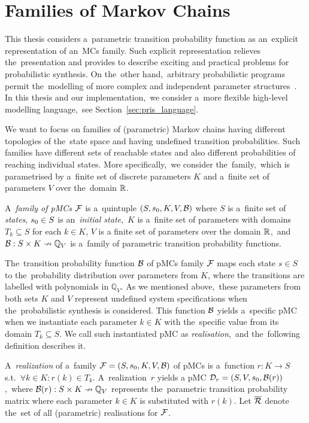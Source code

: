 \section{Families of Markov Chains}
This thesis considers a~parametric transition probability function as an~explicit representation of an~MCs family.
Such explicit representation relieves the~presentation and provides to describe exciting and practical problems for probabilistic synthesis.
On the~other hand,~arbitrary probabilistic programs permit the~modelling of more complex and independent parameter structures~\cite{cegar}.
In this thesis and our implementation,~we consider a~more flexible high-level modelling language,~see Section~\ref{sec:pris_language}.

We want to focus on families of (parametric) Markov chains having different topologies of the~state space and having undefined transition probabilities.
Such families have different sets of reachable states and also different probabilities of reaching individual states.
More specifically,~we consider the~family,~which is parametrised by a~finite set of discrete parameters $K$ and a~finite set of parameters $V$ over the~domain $\mathbb{R}$.

\begin{definition}
\cite{cegar}
    A~\emph{family of pMCs} $\mathcal{F}$ is a~quintuple $(S,s_{0},K, V, \mathcal{B})$  where $S$ is a~finite set of \emph{states}, $s_{0} \in S$ is an~\emph{initial state},~$K$ is a~finite set of parameters with domains $T_k \subseteq S$ for each $k \in K$, $V$ is a finite set of parameters over the domain $\mathbb{R}$,~and $\mathcal{B} : S \times K \nrightarrow \mathbb{Q}_V$ is a~family of parametric transition probability functions.
\end{definition}

The~transition probability function $\mathcal{B}$ of pMCs family $\mathcal{F}$ maps each state $s \in S$ to the~probability distribution over parameters from $K$, where the transitions are labelled with polynomials in $\mathbb{Q}_V$.
As we mentioned above,~these parameters from both sets $K$ and $V$ represent undefined system specifications when the~probabilistic synthesis is considered.
This function $\mathcal{B}$ yields a~specific pMC when we instantiate each parameter $k \in K$ with the~specific value from its domain $T_k \subseteq S$.
We call such instantiated pMC as \textit{realisation},~and the~following definition describes it.

\begin{definition}[Realisation]
\cite{cegar}
A~\emph{realization} of a~family $\mathcal{F} = (S,s_{0},K, V, \mathcal{B})$ of pMCs is a~function $r: K \rightarrow S$ s.t.~$\forall k \in K :  r(k) \in T_k$. 
A~realization~$r$ yields a pMC $\mathcal{D}_r = (S, V, s_{0},\mathcal{B}(r))$,~where $\mathcal{B}(r): S \times K \nrightarrow \mathbb{Q}_V$ represents the~parametric transition probability matrix where each parameter $k \in K$ is substituted with $r(k)$. 
Let $\overline{\mathcal{R}}$ denote the~set of all (parametric) realisations for $\mathcal{F}$.
\end{definition}

